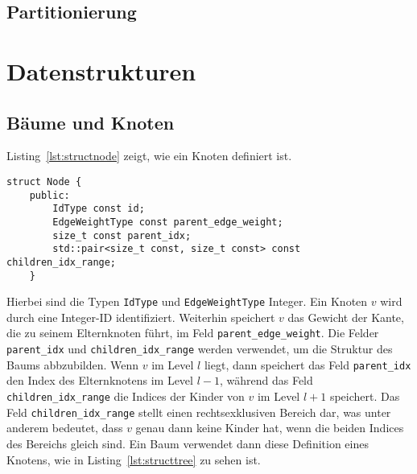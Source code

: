 \subsection{Partitionierung}

\section{Datenstrukturen}
\subsection{Bäume und Knoten}
Listing~\ref{lst:structnode} zeigt, wie ein Knoten definiert ist.
\begin{lstlisting}[caption={Definition von \texttt{struct Node}}, label={lst:structnode}]
struct Node {
    public:
        IdType const id;
        EdgeWeightType const parent_edge_weight;
        size_t const parent_idx;
        std::pair<size_t const, size_t const> const children_idx_range;
    }
\end{lstlisting}

Hierbei sind die Typen \texttt{IdType} und \texttt{EdgeWeightType} Integer.
Ein Knoten $v$ wird durch eine Integer-ID identifiziert. 
Weiterhin speichert $v$ das Gewicht der Kante, die zu seinem Elternknoten führt, im Feld \texttt{parent\_edge\_weight}.
Die Felder \texttt{parent\_idx} und \texttt{children\_idx\_range} werden verwendet, um die Struktur des Baums abbzubilden.
Wenn $v$ im Level $l$ liegt, dann speichert das Feld \texttt{parent\_idx} den Index des Elternknotens im Level $l-1$, während das Feld \texttt{children\_idx\_range} die Indices der Kinder von $v$ im Level $l+1$ speichert.
Das Feld \texttt{children\_idx\_range} stellt einen rechtsexklusiven Bereich dar, was unter anderem bedeutet, dass $v$ genau dann keine Kinder hat, wenn die beiden Indices des Bereichs gleich sind.
Ein Baum verwendet dann diese Definition eines Knotens, wie in Listing~\ref{lst:structtree} zu sehen ist.

